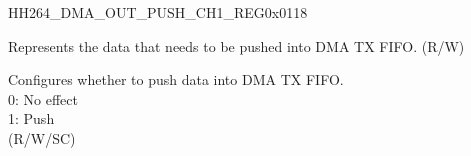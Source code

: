     \begin{register}{H}{H264\_DMA\_OUT\_PUSH\_CH1\_REG}{0x0118}\label{regdesc:H264DMAOUTPUSHCH1REG}
    \regnewline%
    \begin{regdesc}\begin{reglist}
    \label{fielddesc:H264DMAOUTFIFOWDATACH1}\item [H264\_DMA\_OUTFIFO\_WDATA\_CH1] Represents the data that needs to be pushed into DMA TX FIFO. (R/W)
    \label{fielddesc:H264DMAOUTFIFOPUSHCH1}\item [H264\_DMA\_OUTFIFO\_PUSH\_CH1] Configures whether to push data into DMA TX FIFO.\\
    0: No effect\\
    1: Push \\(R/W/SC)
    \end{reglist}\end{regdesc}
    \end{register}
    
